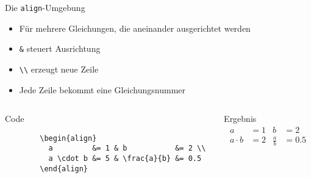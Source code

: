 \begin{frame}[fragile]{Die \texttt{align}-Umgebung}
  \begin{itemize}
    \item Für mehrere Gleichungen, die aneinander ausgerichtet werden
    \item \texttt{\&} steuert Ausrichtung
    \item \verb+\\+ erzeugt neue Zeile
    \item Jede Zeile bekommt eine Gleichungsnummer
  \end{itemize}
  \begin{columns}[onlytextwidth, t]
    \begin{column}{0.65\textwidth}
      \begin{block}{Code}
        \begin{lstlisting}
        \begin{align}
          a         &= 1 & b           &= 2 \\
          a \cdot b &= 5 & \frac{a}{b} &= 0.5
        \end{align}
        \end{lstlisting}
      \end{block}
    \end{column}
    \begin{column}{0.31\textwidth}
      \begin{block}{Ergebnis}
        \begin{align}
          a         &= 1 & b           &= 2 \\
          a \cdot b &= 2 & \frac{a}{b} &= 0.5
        \end{align}
      \end{block}
    \end{column}
  \end{columns}
\end{frame}

